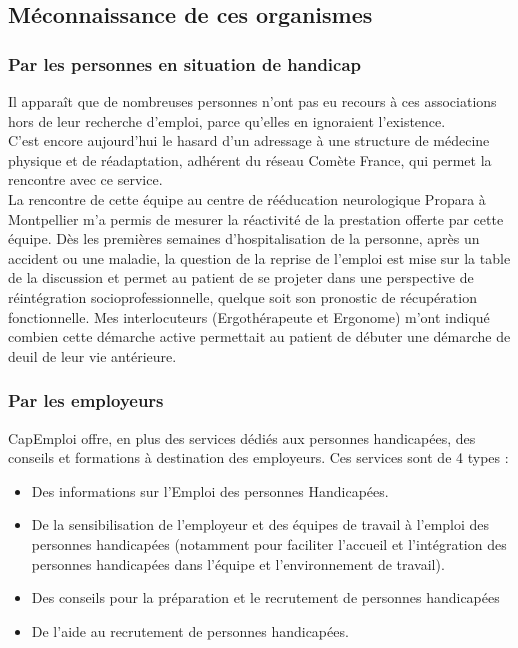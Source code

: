 \subsection{Méconnaissance de ces organismes}
\subsubsection{Par les personnes en situation de handicap}
Il apparaît que de nombreuses personnes n'ont pas eu recours à ces associations hors de leur recherche d'emploi, parce qu'elles en ignoraient l'existence.\\

C'est encore aujourd'hui le hasard d'un adressage à une structure de médecine physique et de réadaptation, adhérent du réseau Comète France, qui permet la rencontre avec ce service. \\

La rencontre de cette équipe au centre de rééducation neurologique Propara à Montpellier m'a permis de mesurer la réactivité de la prestation offerte par cette équipe. Dès les premières semaines d'hospitalisation de la personne, après un accident ou une maladie, la question de la reprise de l'emploi est mise sur la table de la discussion et permet au patient de se projeter dans une perspective de réintégration socioprofessionnelle, quelque soit son pronostic de récupération fonctionnelle. Mes interlocuteurs (Ergothérapeute et Ergonome) m'ont indiqué combien cette démarche active permettait au patient de débuter une démarche de deuil de leur vie antérieure.

\subsubsection{Par les employeurs}
CapEmploi offre, en plus des services dédiés aux personnes handicapées, des conseils et formations à destination des employeurs.
Ces services sont de 4 types :
\begin{itemize}
\item Des informations sur l'Emploi des personnes Handicapées.
\item De la sensibilisation de l'employeur et des équipes de travail à l'emploi des personnes handicapées (notamment pour faciliter l'accueil et l'intégration des personnes handicapées dans l'équipe et l'environnement de travail).
\item Des conseils pour la préparation et le recrutement de personnes handicapées
\item De l'aide au recrutement de personnes handicapées.\\
\end{itemize}

